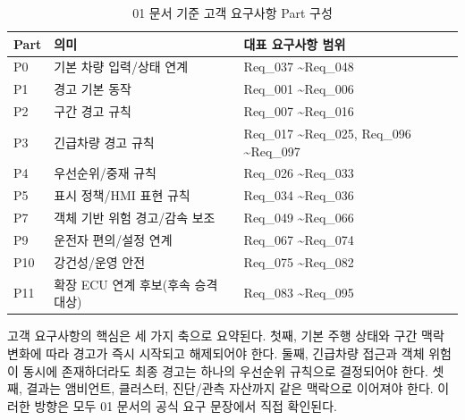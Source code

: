 \documentclass[11pt,a4paper]{article}
\begin{document}
\begin{table}[H]
\centering
\begin{tabularx}{\textwidth}{|p{20mm}|p{46mm}|X|}
\hline
\textbf{Part} & \textbf{의미} & \textbf{대표 요구사항 범위} \\ \hline
P0 & 기본 차량 입력/상태 연계 & Req\_037 \textasciitilde Req\_048 \\ \hline
P1 & 경고 기본 동작 & Req\_001 \textasciitilde Req\_006 \\ \hline
P2 & 구간 경고 규칙 & Req\_007 \textasciitilde Req\_016 \\ \hline
P3 & 긴급차량 경고 규칙 & Req\_017 \textasciitilde Req\_025, Req\_096 \textasciitilde Req\_097 \\ \hline
P4 & 우선순위/중재 규칙 & Req\_026 \textasciitilde Req\_033 \\ \hline
P5 & 표시 정책/HMI 표현 규칙 & Req\_034 \textasciitilde Req\_036 \\ \hline
P7 & 객체 기반 위험 경고/감속 보조 & Req\_049 \textasciitilde Req\_066 \\ \hline
P9 & 운전자 편의/설정 연계 & Req\_067 \textasciitilde Req\_074 \\ \hline
P10 & 강건성/운영 안전 & Req\_075 \textasciitilde Req\_082 \\ \hline
P11 & 확장 ECU 연계 후보(후속 승격 대상) & Req\_083 \textasciitilde Req\_095 \\ \hline
\end{tabularx}
\caption{01 문서 기준 고객 요구사항 Part 구성}
\end{table}

고객 요구사항의 핵심은 세 가지 축으로 요약된다. 첫째, 기본 주행 상태와 구간 맥락 변화에 따라 경고가 즉시 시작되고 해제되어야 한다. 둘째, 긴급차량 접근과 객체 위험이 동시에 존재하더라도 최종 경고는 하나의 우선순위 규칙으로 결정되어야 한다. 셋째, 결과는 앰비언트, 클러스터, 진단/관측 자산까지 같은 맥락으로 이어져야 한다. 이러한 방향은 모두 01 문서의 공식 요구 문장에서 직접 확인된다.
\end{document}
